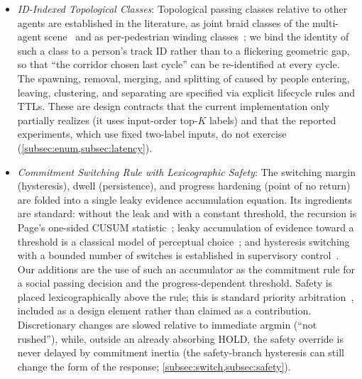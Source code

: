 \begin{itemize}
\item \emph{ID-Indexed Topological Classes}: Topological passing classes relative to other agents are established in the literature, as joint braid classes of the multi-agent scene~\citep{mavrogiannis2019braids} and as per-pedestrian winding classes~\citep{mavrogiannis2023winding}; we bind the identity of such a class to a person's track ID rather than to a flickering geometric gap, so that ``the corridor chosen last cycle'' can be re-identified at every cycle. The spawning, removal, merging, and splitting of  caused by people entering, leaving, clustering, and separating are specified via explicit lifecycle rules and TTLs. These are design contracts that the current implementation only partially realizes (it uses input-order top-$K$ labels) and that the reported experiments, which use fixed two-label inputs, do not exercise (\cref{subsec:enum,subsec:latency}).
\item \emph{Commitment Switching Rule with Lexicographic Safety}: The switching margin (hysteresis), dwell (persistence), and progress hardening (point of no return) are folded into a single leaky evidence accumulation equation. Its ingredients are standard: without the leak and with a constant threshold, the recursion is Page's one-sided CUSUM statistic~\citep{page1954cusum}; leaky accumulation of evidence toward a threshold is a classical model of perceptual choice~\citep{usher2001lca}; and hysteresis switching with a bounded number of switches is established in supervisory control~\citep{hespanha2003hysteresis}. Our additions are the use of such an accumulator as the commitment rule for a social passing decision and the progress-dependent threshold. Safety is placed lexicographically above the rule; this is standard priority arbitration~\citep{orzechowski2020arbitration,spieker2024arbitration}, included as a design element rather than claimed as a contribution. Discretionary changes are slowed relative to immediate argmin (``not rushed''), while, outside an already absorbing HOLD, the safety override is never delayed by commitment inertia (the safety-branch hysteresis can still change the form of the response; \cref{subsec:switch,subsec:safety}).

\end{itemize}
